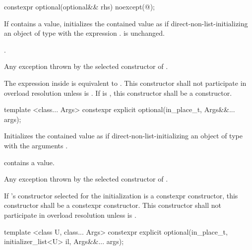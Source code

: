 %
\begin{itemdecl}
constexpr optional(optional&& rhs) noexcept(@\seebelow@);
\end{itemdecl}

\begin{itemdescr}
\pnum
\effects
If  contains a value, initializes the contained value as if
direct-non-list-initializing an object of type  with the expression .
 is unchanged.

\pnum
\postconditions
{}.

\pnum
\throws
Any exception thrown by the selected constructor of .

\pnum
\remarks
The expression inside  is equivalent to
.
This constructor shall not participate in overload resolution
unless  is .
If  is ,
this constructor shall be a  constructor.
\end{itemdescr}

%
\begin{itemdecl}
template <class... Args> constexpr explicit optional(in_place_t, Args&&... args);
\end{itemdecl}

\begin{itemdescr}
\pnum
\effects
Initializes the contained value as if direct-non-list-initializing an object of type  with the arguments .

\pnum
\postconditions
{} contains a value.

\pnum
\throws
Any exception thrown by the selected constructor of .

\pnum
\remarks
If 's constructor selected for the initialization is a constexpr constructor, this constructor shall be a constexpr constructor.
This constructor shall not participate in overload resolution
unless  is .
\end{itemdescr}

%
\begin{itemdecl}
template <class U, class... Args>
  constexpr explicit optional(in_place_t, initializer_list<U> il, Args&&... args);
\end{itemdecl}

